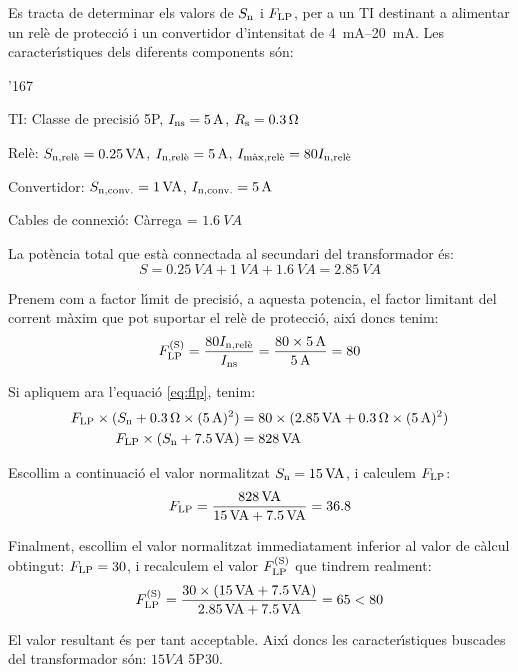 \begin{exemple}

Es tracta de determinar els valors de $S_\mathrm{n}$ i $F_\mathrm{LP}$,  per
a un TI destinant a alimentar  un rel\`{e} de protecci\'{o} i un convertidor
d'intensitat de \SIrange{4}{20}{mA}. Les caracter\'{\i}stiques
dels diferents components s\'{o}n:
\begin{dinglist}{'167}
    \item TI: Classe de precisi\'{o}  5P, $I_\mathrm{ns}=5\mathrm{\,A}$,
    $R_\mathrm{s}=\SI{0,3}{\ensuremath{\mathrm{\Omega}}}$
    \item Rel\`{e}: $S_\mathrm{n,rel\grave{e}}=\SI{0,25}{VA}$,
    $I_\mathrm{n,rel\grave{e}}=5\mathrm{\,A}$, $I_\mathrm{m\grave{a}x,rel\grave{e}}=
    80 I_\mathrm{n,rel\grave{e}}$
    \item Convertidor: $S_\mathrm{n,conv.}=1\mathrm{\,VA}$,
    $I_\mathrm{n,conv.}=5\mathrm{\,A}$
    \item Cables de connexi\'{o}: C\`{a}rrega = $\SI{1,6}{VA}$
\end{dinglist}

La pot\`{e}ncia total que est\`{a} connectada al secundari del transformador
\'{e}s:
\[
    S = \SI{0,25}{VA} + \SI{1}{VA} + \SI{1,6}{VA} = \SI{2,85}{VA}
\]

Prenem com a factor l\'{\i}mit de precisi\'{o},  a aquesta potencia, el
factor limitant del corrent m\`{a}xim que pot suportar el rel\`{e} de
protecci\'{o}, aix\'{\i} doncs tenim:
\[
    F_\mathrm{LP}^\mathrm{(S)} = \frac{80 I_\mathrm{n,rel\grave{e}}}{I_\mathrm{ns}} =
    \frac{80\times 5\mathrm{\,A}}{5\mathrm{\,A}} = 80
\]

Si apliquem ara l'equaci\'{o} \eqref{eq:flp}, tenim:
\begin{align*}
    F_\mathrm{LP}\times(S_\mathrm{n}+\SI{0,3}{\ensuremath{\mathrm{\Omega}}} \times (5\mathrm{\,A})^2) &=
    80\times(\SI{2,85}{VA}+\SI{0,3}{\ensuremath{\mathrm{\Omega}}} \times (5\mathrm{\,A})^2) \\
    F_\mathrm{LP}\times(S_\mathrm{n}+\SI{7,5}{VA}) &= 828\mathrm{\,VA}
\end{align*}

Escollim a continuaci\'{o} el valor normalitzat $S_\mathrm{n}=
15\mathrm{\,VA}$, i calculem $F_\mathrm{LP}$:
\[
    F_\mathrm{LP} = \frac{828\mathrm{\,VA}}{15\mathrm{\,VA}+\SI{7,5}{VA}}
    = \num{36,8}
\]

Finalment, escollim el valor normalitzat immediatament inferior al valor
de c\`{a}lcul obtingut: $F_\mathrm{LP} = 30$, i
recalculem el valor $F_\mathrm{LP}^\mathrm{(S)}$ que tindrem realment:
\[
    F_\mathrm{LP}^\mathrm{(S)} = \frac{30\times(15\mathrm{\,VA} + \SI{7,5}{VA})}
    {\SI{2,85}{VA} + \SI{7,5}{VA}} = 65 < 80
    \]

    El valor resultant \'{e}s per tant acceptable. Aix\'{\i} doncs les
    caracter\'{\i}stiques buscades del transformador s\'{o}n: $15\unit{VA}$ 5P30.

\end{exemple}

